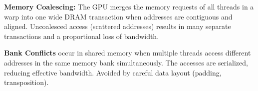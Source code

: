 \begin{definition}
    \textbf{Memory Coalescing:} The GPU merges the memory requests of all threads in a warp into one wide DRAM transaction when addresses are contiguous and aligned. Uncoalesced access (scattered addresses) results in many separate transactions and a proportional loss of bandwidth.
\end{definition}

\begin{definition}
    \textbf{Bank Conflicts} occur in shared memory when multiple threads access different addresses in the same memory bank simultaneously. The accesses are serialized, reducing effective bandwidth. Avoided by careful data layout (padding, transposition).
\end{definition}